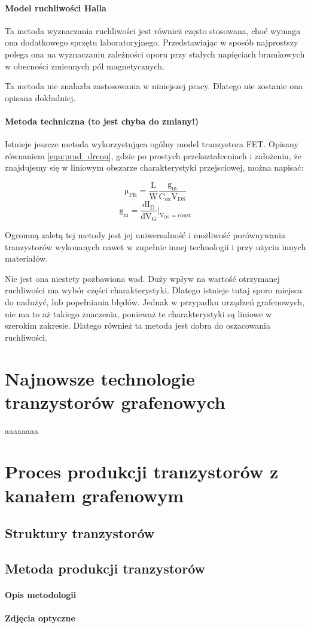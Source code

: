 \paragraph{Model ruchliwości Halla}
Ta metoda wyznaczania ruchliwości jest również często stosowana, choć wymaga ona dodatkowego sprzętu laboratoryjnego. 
Przedstawiając w sposób najprostszy polega ona na wyznaczaniu zależności oporu przy stałych napięciach bramkowych
w obecności zmiennych pól magnetycznych. 

Ta metoda nie znalazła zastosowania w niniejszej pracy. Dlatego nie zostanie ona opisana dokładniej.

\paragraph{Metoda techniczna (to jest chyba do zmiany!)}
Istnieje jeszcze metoda wykorzystująca ogólny model tranzystora FET. Opisany równaniem \ref{equ:prad_drenu}, gdzie po 
prostych przekształceniach i założeniu, że znajdujemy się w liniowym obszarze charakterystyki przejsciowej, można napisać:

\begin{equation}
    \mathrm{ \mu_{FE} = \frac{L}{W}\frac{g_m}{C_{ox}V_{DS}}}
\end{equation}
\begin{equation}
    \mathrm{ g_m = \frac{d I_D}{d V_G} |_{ V_{DS}=const}}
\end{equation}

Ogromną zaletą tej metody jest jej uniwersalność i możliwość porównywania tranzystorów wykonanych nawet w zupełnie innej
technologii i przy użyciu innych materiałów. 

Nie jest ona niestety pozbawiona wad. Duży wpływ na wartość otrzymanej ruchliwości ma wybór części charakterystyki. 
Dlatego istnieje tutaj sporo miejsca do nadużyć, lub popełniania błędów. Jednak w przypadku urządzeń grafenowych, nie ma
to aż takiego znaczenia, ponieważ te charakterystyki są liniowe w szerokim zakresie. Dlatego również ta metoda jest dobra
do oszacowania ruchliwości.

	\section{Najnowsze technologie tranzystorów grafenowych}
aaaaaaaa
	\section{Proces produkcji tranzystorów z kanałem grafenowym}
		\subsection{Struktury tranzystorów}
		\subsection{Metoda produkcji tranzystorów}
			\paragraph{Opis metodologii}
			\paragraph{Zdjęcia optyczne}
